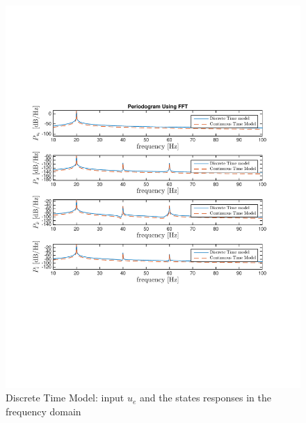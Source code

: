 \begin{figure}[H]
 \centering 
 \includegraphics[trim=2cm 7cm 2cm 7cm, clip=true, totalheight=0.35\textheight, angle=0]{figures/P13frequencyDomain.pdf}
 \caption{Discrete Time Model: input $u_e$ and the states responses in the frequency domain}
 \label{fig:P13f}
\end{figure}
